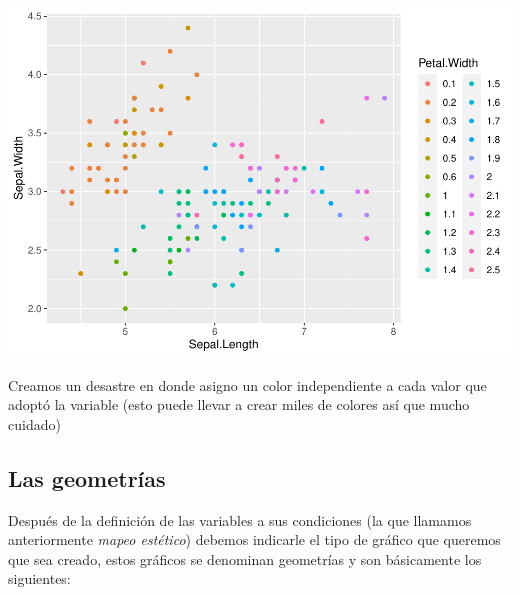 \documentclass[
]{book}
\newenvironment{Shaded}{\begin{snugshade}}{\end{snugshade}}
\newcommand{\CommentTok}[1]{\textcolor[rgb]{0.56,0.35,0.01}{\textit{#1}}}
\newcommand{\FunctionTok}[1]{\textcolor[rgb]{0.00,0.00,0.00}{#1}}
\newcommand{\NormalTok}[1]{#1}
\newcommand{\OtherTok}[1]{\textcolor[rgb]{0.56,0.35,0.01}{#1}}
\newcommand{\SpecialCharTok}[1]{\textcolor[rgb]{0.00,0.00,0.00}{#1}}
\begin{document}
\includegraphics{Esatadistica_en_R_files/figure-latex/unnamed-chunk-147-1.pdf}

\begin{Shaded}
\end{Shaded}

Creamos un desastre en donde asigno un color independiente a cada valor que adoptó la variable (esto puede llevar a crear miles de colores así que mucho cuidado)

\hypertarget{las-geometruxedas}{%
\subsection{Las geometrías}\label{las-geometruxedas}}

Después de la definición de las variables a sus condiciones (la que llamamos anteriormente \emph{mapeo estético}) debemos indicarle el tipo de gráfico que queremos que sea creado, estos gráficos se denominan geometrías y son básicamente los siguientes:
\end{document}
